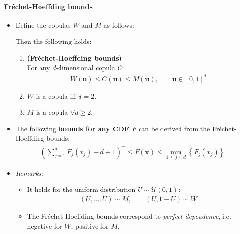 \documentclass[a4paper,landscape,8pt,fleqn]{scrartcl}
\newcommand*\widefbox[1]{\fbox{\hspace{2em}#1\hspace{2em}}}		%
\renewcommand{\emph}[1]{\textbf{#1}}
\begin{document}
\begin{multicols*}{3}
\paragraph{Fréchet-Hoeffding bounds}
\begin{itemize}
\item Define the copulas $W$ and $M$ as follows:
Then the following holds:
\begin{enumerate}
\item \emph{(Fréchet-Hoeffding bounds)} \\
For any $d$-dimensional copula $C$:
\begin{align*}
W(\bm u) \leq C(\bm u) \leq M(\bm u), \qquad \bm u \in [0,1]^d
\end{align*}
\item $W$ is a copula iff $d = 2$.
\item $M$ is a copula $\forall d \geq 2$.
\end{enumerate}
\item The following \emph{bounds for any CDF $F$} can be derived from the Fréchet-Hoeffding bounds:
\begin{align*}
\left( \sum_{j=1}^d F_j(x_j) - d + 1 \right)^+ \leq F(\bm x) \leq \min_{1 \leq j \leq d} \left\lbrace F_j(x_j) \right\rbrace
\end{align*}
\item \textit{Remarks:}
\begin{itemize}
\item It holds for the uniform distribution $U \sim \mathcal{U}(0,1)$:
\begin{align*}
(U, \ldots, U) \sim M, \qquad (U, 1-U) \sim W
\end{align*}
\item The Fréchet-Hoeffding bounds correspond to \textit{perfect dependence}, i.e. negative for $W$, positive for $M$.
\end{itemize}
\end{itemize}


\end{multicols*}
\end{document}
